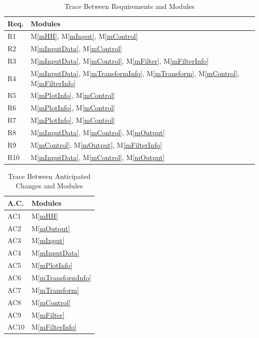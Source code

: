 \documentclass[12pt]{article}
\newcommand{\mref}[1]{M\ref{#1}}
\begin{document}
\begin{table}[h!]
\centering
\caption{Trace Between Requirements and Modules}
\begin{tabular}{p{} p{}}
\toprule
\textbf{Req.} & \textbf{Modules}\\
\midrule
R1 & \mref{mHH}, \mref{mInput}, \mref{mControl}\\
R2 & \mref{mInputData}, \mref{mControl}\\
R3 & \mref{mInputData}, \mref{mControl}, \mref{mFilter}, \mref{mFilterInfo}\\
R4 & 
\mref{mInputData}, \mref{mTransformInfo}, \mref{mTransform}, \mref{mControl},
\mref{mFilterInfo}\\
R5 & \mref{mPlotInfo}, \mref{mControl}\\
R6 & \mref{mPlotInfo}, \mref{mControl}\\
R7 & \mref{mPlotInfo}, \mref{mControl}\\
 R8 & \mref{mInputData}, \mref{mControl}, \mref{mOutput}\\
 R9 & \mref{mControl}, \mref{mOutput}, \mref{mFilterInfo}\\
 R10 & \mref{mInputData}, \mref{mControl}, \mref{mOutput}\\
\bottomrule
\end{tabular}
\label{TblRT}
\end{table}

\begin{table}[h!]
\centering
\caption{Trace Between Anticipated Changes and Modules}
\begin{tabular}{p{} p{}}
\toprule
\textbf{A.C.} & \textbf{Modules}\\
\midrule
AC1 & \mref{mHH}\\
AC2 & \mref{mOutput}\\
AC3 & \mref{mInput}\\
AC4 & \mref{mInputData}\\ 
AC5 & \mref{mPlotInfo}\\
AC6 & \mref{mTransformInfo}\\
AC7 & \mref{mTransform}\\
AC8& \mref{mControl}\\
AC9 & \mref{mFilter}\\
AC10 & \mref{mFilterInfo}\\ 
\bottomrule
\end{tabular}
\label{TblAC}
\end{table}
\end{document}
